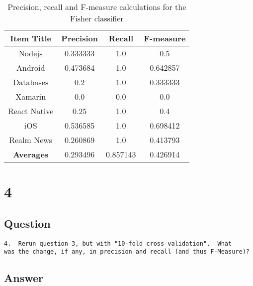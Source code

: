 \documentclass[letterpaper,11pt]{article}
\begin{document}
\begin{table}[h]
\centering
\begin{adjustbox}{max width=\linewidth}
\begin{tabular}{ | c | c | c | c |}
\hline
\textbf{Item Title} & \textbf{Precision} & \textbf{Recall} & \textbf{F-measure} \\
\hline
Nodejs & 0.333333 & 1.0 & 0.5 \\
Android & 0.473684 & 1.0 & 0.642857 \\
Databases & 0.2 & 1.0 & 0.333333 \\
Xamarin & 0.0 & 0.0 & 0.0 \\
React Native & 0.25 & 1.0 & 0.4 \\
iOS & 0.536585 & 1.0 & 0.698412 \\
Realm News & 0.260869 & 1.0 & 0.413793 \\
\hline
\textbf{Averages} & 0.293496 & 0.857143 & 0.426914 \\
\hline
\end{tabular}
\end{adjustbox}
\caption{Precision, recall and F-measure calculations for the Fisher classifier}
\label{table:q3calcs}
\end{table}


\clearpage


\section*{4}

\subsection*{Question}

\begin{verbatim}
4.  Rerun question 3, but with "10-fold cross validation".  What
was the change, if any, in precision and recall (and thus F-Measure)?
\end{verbatim}

\subsection*{Answer}
\end{document}
